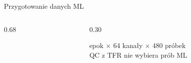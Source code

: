 \begin{frame}{Przygotowanie danych ML}
\begin{columns}[T,onlytextwidth]
\begin{column}{0.68\textwidth}
\vspace{4pt}
\end{column}
\begin{column}{0.30\textwidth}
\centering{}

{\fontsize{10}{12} epok $\times$ 64 kanały $\times$ 480 próbek\\ QC z TFR nie wybiera prób ML}
\end{column}
\end{columns}
\end{frame}
